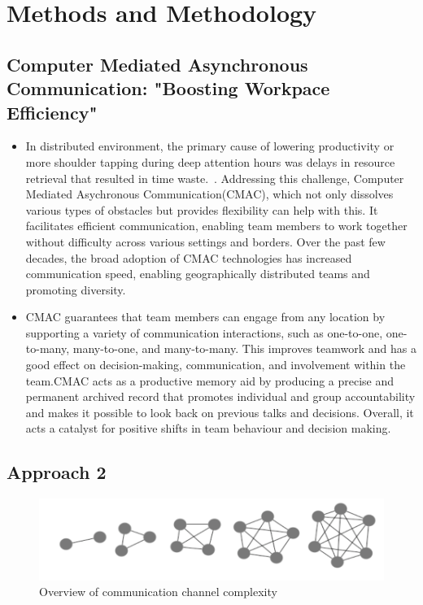 \documentclass{llncs}
\begin{document}
\section{Methods and Methodology}
\subsection{Computer Mediated Asynchronous Communication: "Boosting Workpace Efficiency"}

\begin{itemize}
    \item In distributed environment, the primary cause of lowering productivity or more shoulder tapping during deep attention hours was delays in resource retrieval that resulted in time waste.~\cite{refbook1}. Addressing this challenge, Computer Mediated Asychronous Communication(CMAC), which not only dissolves various types of obstacles but provides flexibility can help with this. It facilitates efficient communication, enabling team members to work together without difficulty across various settings and borders. Over the past few decades, the broad adoption of CMAC technologies has increased communication speed, enabling geographically distributed teams and promoting diversity.~\cite{refpaper5}\\
    \item CMAC guarantees that team members can engage from any location by supporting a variety of communication interactions, such as one-to-one, one-to-many, many-to-one, and many-to-many. This improves teamwork and has a good effect on decision-making, communication, and involvement within the team.CMAC acts as a productive memory aid by producing a precise and permanent archived record that promotes individual and group accountability and makes it possible to look back on previous talks and decisions. Overall, it acts a catalyst for positive shifts in team behaviour and decision making.~\cite{refpaper5}
\end{itemize}

\subsection{Approach 2}

\begin{figure}
    \centering
    \includegraphics[width=0.9\linewidth]{CommunicationComplexity.png}
    \caption{Overview of communication channel complexity}
    \label{fig:communication-complexity}
\end{figure}
\end{document}
